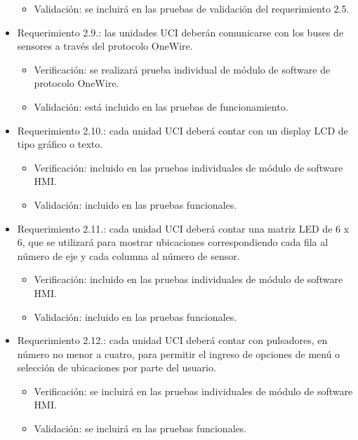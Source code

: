 \documentclass[
11pt, %
codirector, %
]{charter}
\begin{document}
\begin{itemize}
\begin{itemize}
	\item Validación: se incluirá en las pruebas de validación del requerimiento 2.5.
\end{itemize}
\item Requerimiento 2.9.: las unidades UCI deberán comunicarse con los buses de sensores a través del protocolo OneWire. 
\begin{itemize}
	\item Verificación: se realizará prueba individual de módulo de software de protocolo OneWire.
	\item Validación: está incluido en las pruebas de funcionamiento.
\end{itemize}
\item Requerimiento 2.10.: cada unidad UCI deberá contar con un display LCD de tipo gráfico o texto. 
\begin{itemize}
	\item Verificación: incluido en las pruebas individuales de módulo de software HMI. 
	\item Validación: incluido en las pruebas funcionales.
\end{itemize}
\item Requerimiento 2.11.: cada unidad UCI deberá contar una matriz LED de 6 x 6, que se utilizará para mostrar ubicaciones correspondiendo cada fila al número de eje y cada columna al número de sensor. 
\begin{itemize}
	\item Verificación: incluido en las pruebas individuales de módulo de software HMI. 
	\item Validación:  incluido en las pruebas funcionales.
\end{itemize}
\item Requerimiento 2.12.: cada unidad UCI deberá contar con pulsadores, en número no menor a cuatro, para permitir el ingreso de opciones de menú o selección de ubicaciones por parte del usuario. 
\begin{itemize}
	\item Verificación: se incluirá en las pruebas individuales de módulo de software HMI. 
	\item Validación: se incluirá en las pruebas funcionales.

\end{itemize}
\end{itemize}
\end{document}
